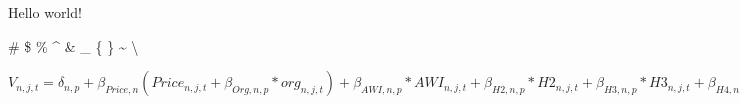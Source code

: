 \documentclass{article}
\begin{document}
Hello world!

\# \$ \% \^{} \& \_ \{ \} \~{} \textbackslash{}


$V_{n,j,t} =\delta_{n,p} +\beta_{Price,n} (Price_{n,j,t}+\beta_{Org,n,p} *org_{n,j,t}) +\beta_{AWI,n,p} *AWI_{n,j,t} +\beta_{H2,n,p} *H2_{n,j,t} +\beta_{H3,n,p} *H3_{n,j,t} +\beta_{H4,n,j} *H4_{n,j,t})$
\end{document}
